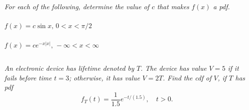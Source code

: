 \documentclass[12pt]{amsart}
\begin{document}
\subsection{} %
\textit{For each of the following, determine the value of $c$ that makes $f(x)$ a pdf.}
	\subsubsection{}
	\( f(x) = c\sin x,\, 0<x<\pi/2 \)
	
	\subsubsection{}
	\( f(x) = ce^{-x|x|},\, -\infty<x<\infty \)
	


\subsection{} %
\textit{An electronic device has lifetime denoted by $T$. The device has value $V = 5$ if it fails
	before time $t = 3$; otherwise, it has value $V = 2T$. Find the cdf of $V$, if $T$ has pdf}
	\[ f_T(t) = \frac{1}{1.5}e^{-t/(1.5)},\quad t>0.\]
\end{document}
